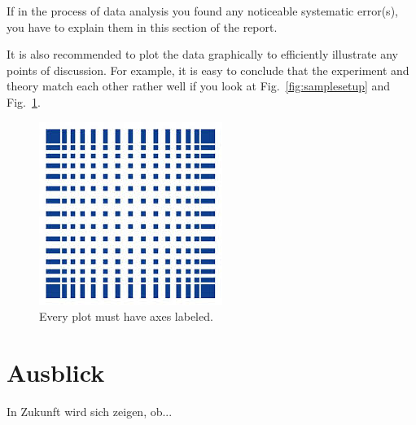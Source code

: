 \documentclass[letterpaper,12pt]{article}
\begin{document}
	If in the process of data analysis you found any noticeable systematic
	error(s), you have to explain them in this section of the report.
	
	It is also recommended to plot the data graphically to efficiently illustrate
	any points of discussion. For example, it is easy to conclude that the
	experiment and theory match each other rather well if you look at
	Fig.~\ref{fig:samplesetup} and Fig.~\ref{fig:exp_plots}.
	
	\begin{figure}[ht] 
		\centering
		\includegraphics[width=0.5\columnwidth]{Images/hsMannheim.jpg}
		
		\caption{
			\label{fig:exp_plots}  
			Every plot must have axes labeled.
		}
	\end{figure}
	
	
	\section{Ausblick}
	In Zukunft wird sich zeigen, ob...
	



	
	
	
	
\end{document}
